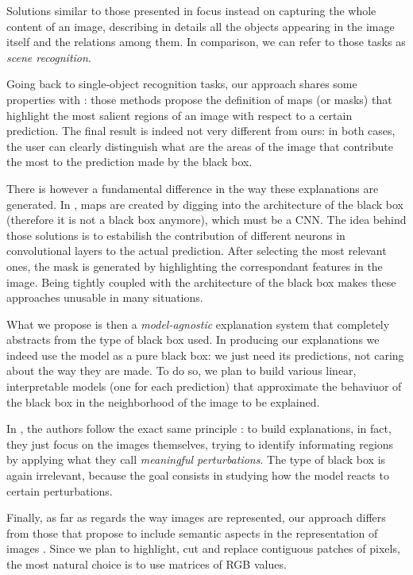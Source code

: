 \documentclass[12pt, twoside, a4paper]{report}
\begin{document}
Solutions similar to those presented in \cite{show-and-tell, show_attend_and_tell} focus instead on capturing the whole content of an image, describing in details all the objects appearing in the image itself and the relations among them. In comparison, we can refer to those tasks as \textit{scene recognition}.

Going back to single-object recognition tasks, our approach shares some properties with \cite{gradcam, neural-attention, zhou}: those methods propose the definition of maps (or masks) that highlight the most salient regions of an image with respect to a certain prediction. The final result is indeed not very different from ours: in both cases, the user can clearly distinguish what are the areas of the image that contribute the most to the prediction made by the black box. 

There is however a fundamental difference in the way these explanations are generated. In \cite{gradcam, neural-attention, zhou}, maps are created by digging into the architecture of the black box (therefore it is not a black box anymore), which must be a CNN. The idea behind those solutions is to estabilish the contribution of different neurons in convolutional layers to the actual prediction. After selecting the most relevant ones, the mask is generated by highlighting the correspondant features in the image. 
Being tightly coupled with the architecture of the black box makes these approaches unusable in many situations.

What we propose is then a \textit{model-agnostic} explanation system that completely abstracts from the type of black box used. In producing our explanations we indeed use the model as a pure black box: we just need its predictions, not caring about the way they are made.
To do so, we plan to build various linear, interpretable models (one for each prediction) that approximate the behaviuor of the black box in the neighborhood of the image to be explained.

In \cite{fong}, the authors follow the exact same principle : to build explanations, in fact, they just focus on the images themselves, trying to identify informating regions by applying what they call \textit{meaningful perturbations}. The type of black box is again irrelevant, because the goal consists in studying how the model reacts to certain perturbations.

Finally, as far as regards the way images are represented, our approach differs from those that propose to include semantic aspects in the representation of images \cite{bag-of-keypoints, yang-visual-words, yang2-visual-words, old-visual-words, visual-word-reconstruction, bag-of-pixels, visual-bag-of-words}. Since we plan to highlight, cut and replace contiguous patches of pixels, the most natural choice is to use matrices of RGB values.
\end{document}
